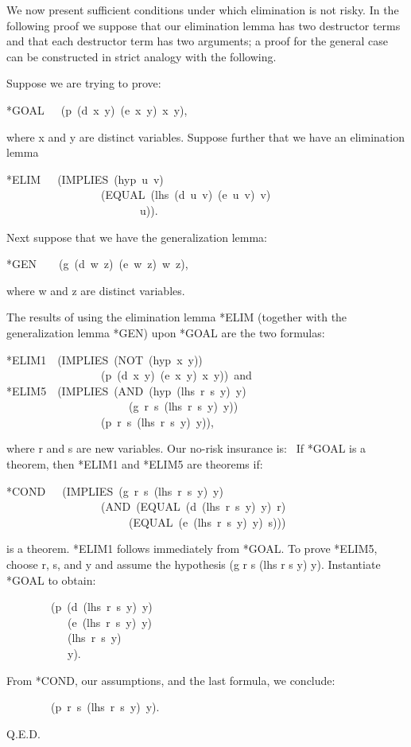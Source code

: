 \documentclass[11pt]{book}
\newenvironment{pubasis}{\begin{flushleft}\ttfamily\small}{\normalsize\rmfamily\end{flushleft}}
\begin{document}
We now present sufficient conditions under which
elimination is not risky.  In the following
proof we suppose that our elimination lemma has
two destructor terms and that each destructor
term has two arguments; a proof for the
general case can be constructed in strict
analogy with the following.  

Suppose we are trying to prove:
\begin{pubasis}
*GOAL~~~(p~(d~x~y)~(e~x~y)~x~y),\\
\end{pubasis}
where x and y are distinct variables.  Suppose
further that we have an elimination lemma
\begin{pubasis}
*ELIM~~~(IMPLIES~(hyp~u~v)\\
~~~~~~~~~~~~~~~~~(EQUAL~(lhs~(d~u~v)~(e~u~v)~v)\\
~~~~~~~~~~~~~~~~~~~~~~~~u)).\\
\end{pubasis}
Next suppose that we have the generalization lemma:
\begin{pubasis}
*GEN~~~~(g~(d~w~z)~(e~w~z)~w~z),\\
\end{pubasis}
where w and z are distinct variables.

The results of using the elimination lemma *ELIM
(together with the generalization lemma *GEN)
upon *GOAL are the two formulas:
\begin{pubasis}
*ELIM1~~(IMPLIES~(NOT~(hyp~x~y))\\
~~~~~~~~~~~~~~~~~(p~(d~x~y)~(e~x~y)~x~y))~and\\

*ELIM5~~(IMPLIES~(AND~(hyp~(lhs~r~s~y)~y)\\
~~~~~~~~~~~~~~~~~~~~~~(g~r~s~(lhs~r~s~y)~y))\\
~~~~~~~~~~~~~~~~~(p~r~s~(lhs~r~s~y)~y)),\\
\end{pubasis}
where r and s are new variables.  Our no-risk insurance is:~
If *GOAL is a theorem, then *ELIM1 and *ELIM5
are theorems if:
\begin{pubasis}
*COND~~~(IMPLIES~(g~r~s~(lhs~r~s~y)~y)\\
~~~~~~~~~~~~~~~~~(AND~(EQUAL~(d~(lhs~r~s~y)~y)~r)\\
~~~~~~~~~~~~~~~~~~~~~~(EQUAL~(e~(lhs~r~s~y)~y)~s)))\\
\end{pubasis}
is a theorem.  *ELIM1 follows immediately from *GOAL.  To prove
*ELIM5, choose r, s, and y and assume the hypothesis
(g r s (lhs r s y) y).  Instantiate *GOAL to obtain:
\begin{pubasis}
~~~~~~~~(p~(d~(lhs~r~s~y)~y)\\
~~~~~~~~~~~(e~(lhs~r~s~y)~y)\\
~~~~~~~~~~~(lhs~r~s~y)\\
~~~~~~~~~~~y).\\
\end{pubasis}
From *COND, our assumptions, and the last formula, we 
conclude:
\begin{pubasis}
~~~~~~~~(p~r~s~(lhs~r~s~y)~y).\\
\end{pubasis}
Q.E.D.
\end{document}
